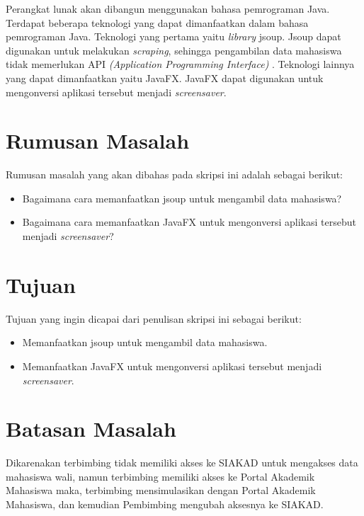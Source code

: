 Perangkat lunak akan dibangun menggunakan bahasa pemrograman Java. Terdapat beberapa teknologi yang dapat dimanfaatkan dalam bahasa pemrograman Java. Teknologi yang pertama yaitu \textit{library} jsoup. Jsoup dapat digunakan untuk melakukan \textit{scraping}, sehingga pengambilan data mahasiswa tidak memerlukan API \textit{(Application Programming Interface)} \cite{jsoup}. Teknologi lainnya yang dapat dimanfaatkan yaitu JavaFX. JavaFX dapat digunakan untuk mengonversi aplikasi tersebut menjadi \textit{screensaver}.



\section{Rumusan Masalah}
\label{sec:rumusan}
Rumusan masalah yang akan dibahas pada skripsi ini adalah sebagai berikut:
\begin{itemize}
	\item Bagaimana cara memanfaatkan jsoup untuk mengambil data mahasiswa?
	\item Bagaimana cara memanfaatkan JavaFX untuk mengonversi aplikasi tersebut menjadi \textit{screensaver}?
\end{itemize}   

\section{Tujuan}
\label{sec:tujuan}
Tujuan yang ingin dicapai dari penulisan skripsi ini sebagai berikut:
\begin{itemize}
    \item Memanfaatkan jsoup untuk mengambil data mahasiswa.
    \item Memanfaatkan JavaFX untuk mengonversi aplikasi tersebut menjadi \textit{screensaver}.
\end{itemize}

\section{Batasan Masalah}
\label{sec:batasan}
Dikarenakan terbimbing tidak memiliki akses ke SIAKAD untuk mengakses data mahasiswa wali, namun terbimbing memiliki akses ke Portal Akademik Mahasiswa maka, terbimbing mensimulasikan dengan Portal Akademik Mahasiswa, dan kemudian Pembimbing mengubah aksesnya ke SIAKAD. 

